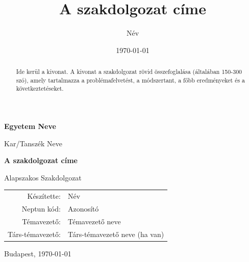 \documentclass[12pt,a4paper]{report}
\title{A szakdolgozat címe}
\author{Név}
\date{\today}
\begin{document}
\makeatletter
\def\@makechapterhead#1{%
  {\parindent \z@ \raggedright \normalfont
    \ifnum \c@secnumdepth >\m@ne
        \huge\bfseries \thechapter.\space #1\par\nobreak
    \else
        \huge\bfseries #1\par\nobreak
    \fi
    \vskip 20\p@
  }}
\makeatother

\begin{titlepage}
    \centering
    \vspace*{2cm}
    
    {\LARGE\bfseries Egyetem Neve\par}
    \vspace{1cm}
    {\Large Kar/Tanszék Neve\par}
    \vspace{2cm}
    
    {\Huge\bfseries A szakdolgozat címe\par}
    \vspace{2cm}
    
    {\Large Alapszakos Szakdolgozat\par}
    \vspace{3cm}
    
    {\large
    \begin{tabular}{rl}
        Készítette: & Név \\
        Neptun kód: & Azonosító \\
        Témavezető: & Témavezető neve \\
        Társ-témavezető: & Társ-témavezető neve (ha van) \\
    \end{tabular}
    \par}
    
    \vfill
    {\large Budapest, \today\par}
\end{titlepage}

\begin{abstract}
Ide kerül a kivonat. A kivonat a szakdolgozat rövid összefoglalása (általában 150-300 szó), amely tartalmazza a problémafelvetést, a módszertant, a főbb eredményeket és a következtetéseket.
\end{abstract}

\tableofcontents
\newpage

\listoffigures
\newpage
\end{document}
